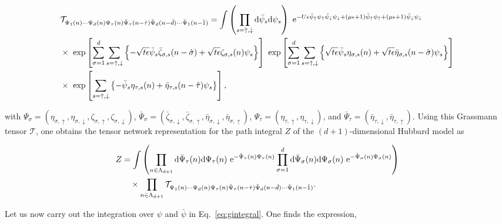 \documentclass[nofootinbib,prd,aps,superscriptaddress,preprintnumbers,twocolumn,showpacs]{revtex4-1}
\begin{document}
\begin{widetext}
\begin{align}
\label{eq:gintegral}
	&\mathcal{T}_{\Psi_{1}(n)\cdots\Psi_{d}(n)\Psi_{\tau}(n)\bar{\Psi}_{\tau}(n-\hat{\tau})\bar{\Psi}_{d}(n-\hat{d})\cdots\bar{\Psi}_{1}(n-\hat{1})}=\int\left(\prod_{s=\uparrow,\downarrow}{\rm d}\bar{\psi}_{s}{\rm d}\psi_{s}\right)~{\rm e}^{-U\epsilon\bar{\psi}_{\uparrow}\psi_{\uparrow}\bar{\psi}_{\downarrow}\psi_{\downarrow}+(\mu\epsilon+1)\bar{\psi}_{\uparrow}\psi_{\uparrow}+(\mu\epsilon+1)\bar{\psi}_{\downarrow}\psi_{\downarrow}}\nonumber\\
	&\times~\exp\left[\sum_{\sigma=1}^{d}\sum_{s=\uparrow,\downarrow}\left\{-\sqrt{t\epsilon}\bar{\psi}_{s}\bar{\zeta}_{\sigma,s}(n-\hat{\sigma})+\sqrt{t\epsilon}\zeta_{\sigma,s}(n)\psi_{s}\right\}\right]~\exp\left[\sum_{\sigma=1}^{d}\sum_{s=\uparrow,\downarrow}\left\{\sqrt{t\epsilon}\bar{\psi}_{s}\eta_{\sigma,s}(n)+\sqrt{t\epsilon}\bar{\eta}_{\sigma,s}(n-\hat{\sigma})\psi_{s}\right\}\right]\nonumber\\
	&\times~\exp\left[\sum_{s=\uparrow,\downarrow}\left\{-\bar{\psi}_{s}\eta_{\tau,s}(n)+\bar{\eta}_{\tau,s}(n-\hat{\tau})\psi_{s}\right\}\right],
\end{align}
\end{widetext}
with $\Psi_{\sigma}=(\eta_{\sigma,\uparrow},\eta_{\sigma,\downarrow},\zeta_{\sigma,\uparrow},\zeta_{\sigma,\downarrow})$, $\bar{\Psi}_{\sigma}=(\bar{\zeta}_{\sigma,\downarrow},\bar{\zeta}_{\sigma,\uparrow},\bar{\eta}_{\sigma,\downarrow},\bar{\eta}_{\sigma,\uparrow})$, $\Psi_{\tau}=(\eta_{\tau,\uparrow},\eta_{\tau,\downarrow})$, and $\bar{\Psi}_{\tau}=(\bar{\eta}_{\tau,\downarrow},\bar{\eta}_{\tau,\uparrow})$.
Using this Grassmann tensor $\mathcal{T}$, one obtains the tensor network representation for the path integral $Z$ of the $(d+1)$-dimensional Hubbard model as
\begin{widetext}
\begin{align}
	Z&=\int\left(\prod_{n\in\Lambda_{d+1}}{\rm d}\bar{\Psi}_{\tau}(n){\rm d}\Psi_{\tau}(n)~{\rm e}^{-\bar{\Psi}_{\tau}(n)\Psi_{\tau}(n)}\prod_{\sigma=1}^{d}{\rm d}\bar{\Psi}_{\sigma}(n){\rm d}\Psi_{\sigma}(n)~{\rm e}^{-\bar{\Psi}_{\sigma}(n)\Psi_{\sigma}(n)}\right)\nonumber\\
	&\quad\times\prod_{n\in\Lambda_{d+1}}\mathcal{T}_{\Psi_{1}(n)\cdots\Psi_{d}(n)\Psi_{\tau}(n)\bar{\Psi}_{\tau}(n-\hat{\tau})\bar{\Psi}_{d}(n-\hat{d})\cdots\bar{\Psi}_{1}(n-\hat{1})}.
\end{align}
\end{widetext}
Let us now carry out the integration over $\psi$ and $\bar{\psi}$ in Eq.~\eqref{eq:gintegral}. One finds the expression,
\end{document}
